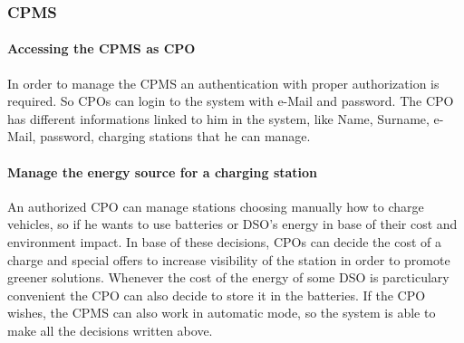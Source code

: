 \subsubsection{\ac{CPMS}}
\paragraph{Accessing the \ac{CPMS} as \ac{CPO}}
In order to manage the \ac{CPMS} an authentication with proper authorization is required. So \acp{CPO} can login to the system with e-Mail and password. The \ac{CPO} has different informations linked to him in the system, like Name, Surname, e-Mail, password, charging stations that he can manage.

\paragraph{Manage the energy source for a charging station}
An authorized \ac{CPO} can manage stations choosing manually how to charge vehicles, so if he wants to use batteries or \ac{DSO}'s energy in base of their cost and environment impact. In base of these decisions, \acp{CPO} can decide the cost of a charge and special offers to increase visibility of the station in order to promote greener solutions. 
Whenever the cost of the energy of some \ac{DSO} is parcticulary convenient the \ac{CPO} can also decide to store it in the batteries. If the \ac{CPO} wishes, the \ac{CPMS} can also work in automatic mode, so the system is able to make all the decisions written above.
 




